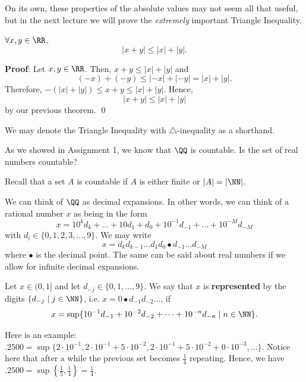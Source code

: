 On its own, these properties of the absolute values may not seem all that useful, but in the next lecture we will prove the \textit{extremely} important Triangle Inequality.



\begin{theorem}
$\forall x,y\in \RR$, 
\[
|x+y| \leq |x|+|y|.
\]
\end{theorem}
\textbf{Proof}: Let $x,y\in\RR$. Then, $x+y\leq |x|+|y|$ and
\[
(-x)+(-y) \leq |-x|+|-y| = |x|+|y|.
\]
Therefore, $-(|x|+|y|)\leq x+y \leq |x|+|y|$. Hence,
\[
|x+y|\leq |x|+|y|
\]
by our previous theorem. \qed 

\begin{remark}
We may denote the Triangle Inequality with $\triangle$-inequality as a shorthand.
\end{remark}

\begin{question}
As we showed in Assignment 1, we know that $\QQ$ is countable. Is the set of real numbers countable?
\end{question}

\begin{recall}
Recall that a set $A$ is countable if $A$ is either finite or $|A| = |\NN|$.
\end{recall}
We can think of $\QQ$ as decimal expansions. In other words, we can think of a rational number $x$ as being in the form
\[
x = 10^k d_k + \dots + 10 d_1 + d_0 + 10^{-1}d_{-1} + \dots + 10^{-M} d_{-M}
\]
with $d_i \in \{0,1,2,3,\dots, 9\}$. We may write
\[
x = d_kd_{k-1}\dots d_1 d_0 \bullet d_{-1} \dots d_{-M}
\]
where $\bullet$ is the decimal point. The same can be said about real numbers if we allow for infinite decimal expansions. 

\begin{definition}
Let $x\in (0,1]$ and let $d_{-j}\in\{0,1,\dots, 9\}$. We say that $x$ is \textbf{represented} by the digits $\{d_{-j}\mid j\in \NN\}$, i.e. $x= 0\bullet d_{-1} d_{-2}\dots$, if 
\[
x = \sup\{10^{-1}d_{-1}+10^{-2}d_{-2}+ \dots + 10^{-n}d_{-n} \mid n\in \NN\}.
\]
\end{definition}
Here is an example: $.2500 = \sup \{2\cdot 10^{-1}, 2\cdot 10^{-1}+5\cdot 10^{-2}, 2\cdot 10^{-1}+5\cdot 10^{-2} + 0 \cdot 10^{-3}, \dots\}$. Notice here that after a while the previous set becomes $\frac{1}{4}$ repeating. Hence, we have $.2500 = \sup\left\{ \frac{1}{5}, \frac{1}{4}\right\} = \frac{1}{4}$.

